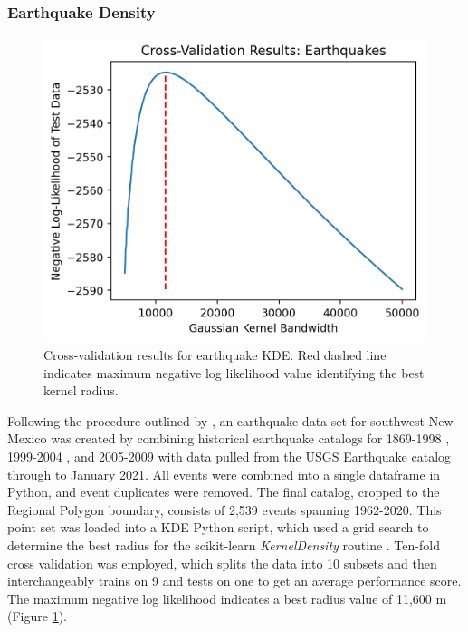 \subsubsection{Earthquake Density}
\begin{figure}
\centering
\includegraphics[scale=0.6]{templates/images/Figure-Earthquakes_kde_gridsearchcv_result.png}
\singlespacing
\caption[Earthquake density parameter tuning]{Cross-validation results for earthquake KDE. Red dashed line indicates maximum negative log likelihood value identifying the best kernel radius.}
\label{fig:EQ_cv}
\end{figure}
Following the procedure outlined by \citet{pepin_new_2018}, an earthquake data set for southwest New Mexico was created by combining historical earthquake catalogs for 1869-1998 \citep{sanford_earthquake_2002}, 1999-2004 \citep{sanford_earthquake_2006}, and 2005-2009 \citep{pursley_earthquake_2013} with data pulled from the USGS Earthquake catalog \citep{usgs_earthquake_2021} through to January 2021. All events were combined into a single dataframe in Python, and event duplicates were removed. The final catalog, cropped to the Regional Polygon boundary, consists of 2,539 events spanning 1962-2020. This point set was loaded into a KDE Python script, which used a grid search to determine the best radius for the scikit-learn \textit{KernelDensity} routine \citep{pedregosa_scikit-learn_2011}. Ten-fold cross validation was employed, which splits the data into 10 subsets and then interchangeably trains on 9 and tests on one to get an average performance score. The maximum negative log likelihood indicates a best radius value of 11,600 m (Figure \ref{fig:EQ_cv}). 


